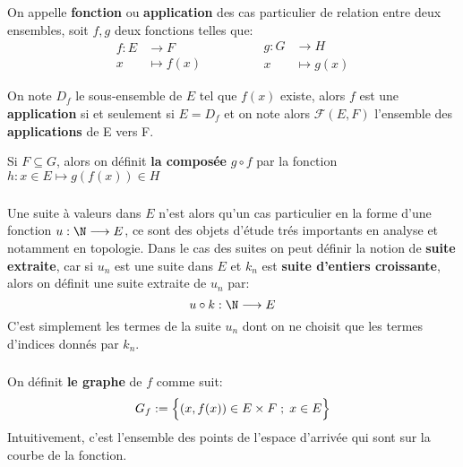 \chapter*{}

On appelle \textbf{fonction} ou \textbf{application} des cas particulier de relation entre deux ensembles, soit \(f, g\) deux fonctions telles que:
\[
   \begin{aligned}
      f: E &\longrightarrow F\\
      x &\longmapsto f(x)
   \end{aligned}
      \hspace{50pt}
   \begin{aligned}
      g: G&\longrightarrow H\\
      x&\longmapsto g(x)
   \end{aligned}
\]

On note \(D_f\) le sous-ensemble de \(E\) tel que \(f(x)\) existe, alors \(f\) est une \textbf{application} si et seulement si \(E = D_f\) et on note alors \(\mathscr{F}(E, F)\) l'ensemble des \textbf{applications} de E vers F.\<

Si \(F \subseteq G\), alors on définit \textbf{la composée} \(g \circ f\) par la fonction \(h: x \in E \longmapsto g(f(x)) \in H\)

\subsection*{}
Une suite à valeurs dans \(E\) n'est alors qu'un cas particulier en la forme d'une fonction \(u : \N \longrightarrow E\), ce sont des objets d'étude trés importants en analyse et notamment en topologie. Dans le cas des suites on peut définir la notion de \textbf{suite extraite}, car si \(u_n\) est une suite dans \(E\) et \(k_n\) est \textbf{suite d'entiers croissante}, alors on définit une suite extraite de \(u_n\) par:
\[
   u \circ k : \N \longrightarrow E
\]
C'est simplement les termes de la suite \(u_n\) dont on ne choisit que les termes d'indices donnés par \(k_n\).
\subsection*{}
On définit \textbf{le graphe} de \(f\) comme suit:
\[
   G_f:= \Bigl\{ (x, f(x)) \in E \times F \; ; \; x \in E\Bigl\}   
\]
Intuitivement, c'est l'ensemble des points de l'espace d'arrivée qui sont sur la courbe de la fonction.

